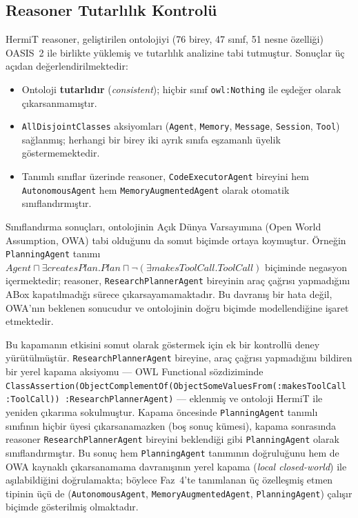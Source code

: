 \documentclass[10pt, a4paper, twocolumn]{article}
\begin{document}
\subsection{Reasoner Tutarlılık Kontrolü}

HermiT reasoner, geliştirilen ontolojiyi (76 birey, 47 sınıf, 51 nesne özelliği) OASIS~2 ile birlikte yüklemiş ve tutarlılık analizine tabi tutmuştur. Sonuçlar üç açıdan değerlendirilmektedir:

\begin{itemize}
\item Ontoloji \textbf{tutarlıdır} (\textit{consistent}); hiçbir sınıf \texttt{owl:Nothing} ile eşdeğer olarak çıkarsanmamıştır.
\item \texttt{AllDisjointClasses} aksiyomları (\texttt{Agent}, \texttt{Memory}, \texttt{Message}, \texttt{Session}, \texttt{Tool}) sağlanmış; herhangi bir birey iki ayrık sınıfa eşzamanlı üyelik göstermemektedir.
\item Tanımlı sınıflar üzerinde reasoner, \texttt{CodeExecutorAgent} bireyini hem \texttt{AutonomousAgent} hem \texttt{MemoryAugmentedAgent} olarak otomatik sınıflandırmıştır.
\end{itemize}

\noindent Sınıflandırma sonuçları, ontolojinin Açık Dünya Varsayımına (Open World Assumption, OWA) tabi olduğunu da somut biçimde ortaya koymuştur. Örneğin \texttt{PlanningAgent} tanımı $\textit{Agent} \sqcap \exists \textit{createsPlan}.\textit{Plan} \sqcap \lnot(\exists \textit{makesToolCall}.\textit{ToolCall})$ biçiminde negasyon içermektedir; reasoner, \texttt{ResearchPlannerAgent} bireyinin araç çağrısı yapmadığını ABox kapatılmadığı sürece çıkarsayamamaktadır. Bu davranış bir hata değil, OWA'nın beklenen sonucudur ve ontolojinin doğru biçimde modellendiğine işaret etmektedir.

Bu kapamanın etkisini somut olarak göstermek için ek bir kontrollü deney yürütülmüştür. \texttt{ResearchPlannerAgent} bireyine, araç çağrısı yapmadığını bildiren bir yerel kapama aksiyomu --- OWL Functional sözdiziminde \texttt{Class\-Assertion(Object\-Complement\-Of(Object\-Some\-Values\-From(:makesToolCall :ToolCall)) :Research\-PlannerAgent)} --- eklenmiş ve ontoloji HermiT ile yeniden çıkarıma sokulmuştur. Kapama öncesinde \texttt{PlanningAgent} tanımlı sınıfının hiçbir üyesi çıkarsanamazken (boş sonuç kümesi), kapama sonrasında reasoner \texttt{ResearchPlannerAgent} bireyini beklendiği gibi \texttt{PlanningAgent} olarak sınıflandırmıştır. Bu sonuç hem \texttt{PlanningAgent} tanımının doğruluğunu hem de OWA kaynaklı çıkarsanamama davranışının yerel kapama (\textit{local closed-world}) ile aşılabildiğini doğrulamakta; böylece Faz~4'te tanımlanan üç özelleşmiş etmen tipinin üçü de (\texttt{AutonomousAgent}, \texttt{MemoryAugmentedAgent}, \texttt{PlanningAgent}) çalışır biçimde gösterilmiş olmaktadır.
\end{document}

